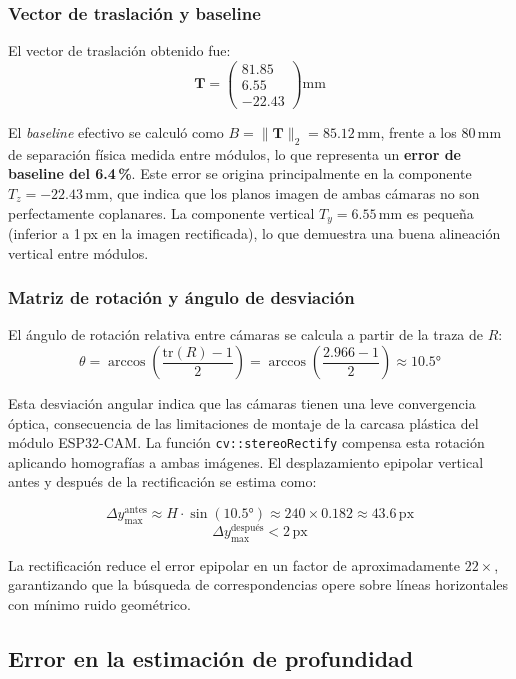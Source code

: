 \subsubsection{Vector de traslación y baseline}

El vector de traslación obtenido fue:
\[
\mathbf{T} = \begin{pmatrix} 81.85 \\ 6.55 \\ -22.43 \end{pmatrix} \text{mm}
\]

El \textit{baseline} efectivo se calculó como $B = \|\mathbf{T}\|_2 = 85.12$\,mm, frente a los 80\,mm de separación física medida entre módulos, lo que representa un \textbf{error de baseline del 6.4\,\%}. Este error se origina principalmente en la componente $T_z = -22.43$\,mm, que indica que los planos imagen de ambas cámaras no son perfectamente coplanares. La componente vertical $T_y = 6.55$\,mm es pequeña (inferior a 1\,px en la imagen rectificada), lo que demuestra una buena alineación vertical entre módulos.

\subsubsection{Matriz de rotación y ángulo de desviación}

El ángulo de rotación relativa entre cámaras se calcula a partir de la traza de $R$:
\[
\theta = \arccos\!\left(\frac{\mathrm{tr}(R) - 1}{2}\right) = \arccos\!\left(\frac{2.966 - 1}{2}\right) \approx 10.5°
\]

Esta desviación angular indica que las cámaras tienen una leve convergencia óptica, consecuencia de las limitaciones de montaje de la carcasa plástica del módulo ESP32-CAM. La función \texttt{cv::stereoRectify} compensa esta rotación aplicando homografías a ambas imágenes. El desplazamiento epipolar vertical antes y después de la rectificación se estima como:

\[
\Delta y_{\max}^{\text{antes}} \approx H \cdot \sin(10.5°) \approx 240 \times 0.182 \approx 43.6\,\text{px}
\]
\[
\Delta y_{\max}^{\text{después}} < 2\,\text{px}
\]

La rectificación reduce el error epipolar en un factor de aproximadamente $22\times$, garantizando que la búsqueda de correspondencias opere sobre líneas horizontales con mínimo ruido geométrico.

\subsection{Error en la estimación de profundidad}

